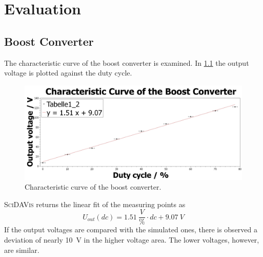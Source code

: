 \chapter{Evaluation}
%
\section{Boost Converter}
    The characteristic curve of the boost converter is examined. In \cref{fig:characteristic-curve-of-the-boost-converter}
    the output voltage is plotted against the duty cycle.
    \begin{figure}[h]
        \centering
        \includegraphics[width=\linewidth]{messdaten/Characteristic_Curve_of_the_Boost_Converter.jpg}
        \caption[Characteristic curve of the boost converter]{Characteristic curve of the boost converter.}
    \label{fig:characteristic-curve-of-the-boost-converter}
    \end{figure}
    \textsc{SciDAVis} returns the linear fit of the measuring points as
    \begin{equation}
        U_{out}(dc)=\SI{1.51}{\frac{V}{\%}} \cdot dc + \SI{9.07}{V}
    \end{equation}
    If the output voltages are compared with the simulated ones, there is observed a deviation of nearly \SI{10}{V} in the
    higher voltage area. The lower voltages, however, are similar.
